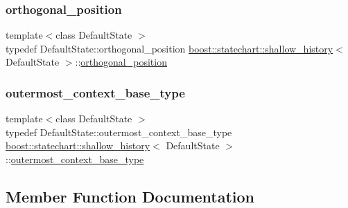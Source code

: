 \subsubsection{\texorpdfstring{orthogonal\+\_\+position}{orthogonal\_position}}
{\footnotesize\ttfamily template$<$class Default\+State $>$ \\
typedef Default\+State\+::orthogonal\+\_\+position \mbox{\hyperlink{classboost_1_1statechart_1_1shallow__history}{boost\+::statechart\+::shallow\+\_\+history}}$<$ Default\+State $>$\+::\mbox{\hyperlink{classboost_1_1statechart_1_1shallow__history_ad8dd479f4274f346d065554c0a60610a}{orthogonal\+\_\+position}}}

\mbox{\label{classboost_1_1statechart_1_1shallow__history_a26036d97ce8fe35752f8397c63673f21}} 
\subsubsection{\texorpdfstring{outermost\+\_\+context\+\_\+base\+\_\+type}{outermost\_context\_base\_type}}
{\footnotesize\ttfamily template$<$class Default\+State $>$ \\
typedef Default\+State\+::outermost\+\_\+context\+\_\+base\+\_\+type \mbox{\hyperlink{classboost_1_1statechart_1_1shallow__history}{boost\+::statechart\+::shallow\+\_\+history}}$<$ Default\+State $>$\+::\mbox{\hyperlink{classboost_1_1statechart_1_1shallow__history_a26036d97ce8fe35752f8397c63673f21}{outermost\+\_\+context\+\_\+base\+\_\+type}}}



\subsection{Member Function Documentation}
\mbox{\label{classboost_1_1statechart_1_1shallow__history_a52c6d3296a0c63266044bf135a9cc5e3}} 

